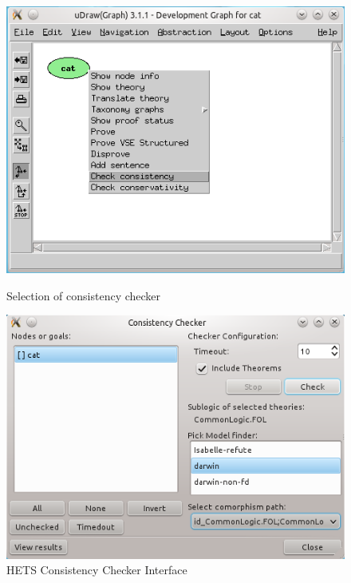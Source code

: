 \documentclass{article}
\newcommand{\normalTEXTSC}[2]{{#1\scriptsize#2}}
\newcommand     {\Hets}{\normalTEXTSC{H}{ETS}\xspace}
\begin{document}
\begin{figure}[ht]
\begin{minipage}[b]{0.5\linewidth}
  \centering
  \includegraphics[width=\linewidth,keepaspectratio=true]{UserGuideCL_Consistency_devGraph}
  \caption{Selection of consistency checker\label{fig:cons_devGraph}}
\end{minipage}
\hspace{0.1\linewidth}
\begin{minipage}[b]{0.5\linewidth}
  \includegraphics[width=\linewidth,keepaspectratio=true]{UserGuideCL_Consistency_Interface}
  \caption{\Hets Consistency Checker Interface\label{fig:cons_window}}
\end{minipage}
\end{figure}
\end{document}
